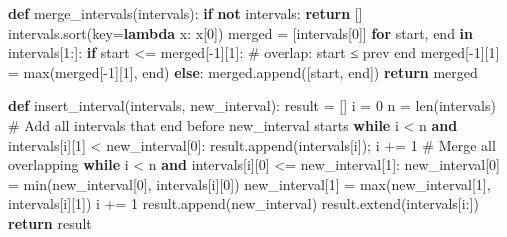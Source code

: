 \documentclass[11pt]{article}
\newenvironment{Shaded}{\begin{snugshade}}{\end{snugshade}}
\newcommand{\BuiltInTok}[1]{\textcolor[rgb]{0.50,0.55,0.55}{#1}}
\newcommand{\CommentTok}[1]{\textcolor[rgb]{0.48,0.49,0.49}{#1}}
\newcommand{\ControlFlowTok}[1]{\textcolor[rgb]{0.99,0.74,0.29}{\textbf{#1}}}
\newcommand{\DecValTok}[1]{\textcolor[rgb]{0.96,0.45,0.00}{#1}}
\newcommand{\KeywordTok}[1]{\textcolor[rgb]{0.81,0.81,0.76}{\textbf{#1}}}
\newcommand{\NormalTok}[1]{\textcolor[rgb]{0.81,0.81,0.76}{#1}}
\newcommand{\OperatorTok}[1]{\textcolor[rgb]{0.81,0.81,0.76}{#1}}
\begin{document}
\begin{Shaded}
\begin{Highlighting}[]
\KeywordTok{def}\NormalTok{ merge\_intervals(intervals):}
    \ControlFlowTok{if} \KeywordTok{not}\NormalTok{ intervals:}
        \ControlFlowTok{return}\NormalTok{ []}
\NormalTok{    intervals.sort(key}\OperatorTok{=}\KeywordTok{lambda}\NormalTok{ x: x[}\DecValTok{0}\NormalTok{])}
\NormalTok{    merged }\OperatorTok{=}\NormalTok{ [intervals[}\DecValTok{0}\NormalTok{]]}
    \ControlFlowTok{for}\NormalTok{ start, end }\KeywordTok{in}\NormalTok{ intervals[}\DecValTok{1}\NormalTok{:]:}
        \ControlFlowTok{if}\NormalTok{ start }\OperatorTok{\textless{}=}\NormalTok{ merged[}\OperatorTok{{-}}\DecValTok{1}\NormalTok{][}\DecValTok{1}\NormalTok{]:          }\CommentTok{\# overlap: start ≤ prev end}
\NormalTok{            merged[}\OperatorTok{{-}}\DecValTok{1}\NormalTok{][}\DecValTok{1}\NormalTok{] }\OperatorTok{=} \BuiltInTok{max}\NormalTok{(merged[}\OperatorTok{{-}}\DecValTok{1}\NormalTok{][}\DecValTok{1}\NormalTok{], end)}
        \ControlFlowTok{else}\NormalTok{:}
\NormalTok{            merged.append([start, end])}
    \ControlFlowTok{return}\NormalTok{ merged}

\KeywordTok{def}\NormalTok{ insert\_interval(intervals, new\_interval):}
\NormalTok{    result }\OperatorTok{=}\NormalTok{ []}
\NormalTok{    i }\OperatorTok{=} \DecValTok{0}
\NormalTok{    n }\OperatorTok{=} \BuiltInTok{len}\NormalTok{(intervals)}
    \CommentTok{\# Add all intervals that end before new\_interval starts}
    \ControlFlowTok{while}\NormalTok{ i }\OperatorTok{\textless{}}\NormalTok{ n }\KeywordTok{and}\NormalTok{ intervals[i][}\DecValTok{1}\NormalTok{] }\OperatorTok{\textless{}}\NormalTok{ new\_interval[}\DecValTok{0}\NormalTok{]:}
\NormalTok{        result.append(intervals[i])}\OperatorTok{;}\NormalTok{ i }\OperatorTok{+=} \DecValTok{1}
    \CommentTok{\# Merge all overlapping}
    \ControlFlowTok{while}\NormalTok{ i }\OperatorTok{\textless{}}\NormalTok{ n }\KeywordTok{and}\NormalTok{ intervals[i][}\DecValTok{0}\NormalTok{] }\OperatorTok{\textless{}=}\NormalTok{ new\_interval[}\DecValTok{1}\NormalTok{]:}
\NormalTok{        new\_interval[}\DecValTok{0}\NormalTok{] }\OperatorTok{=} \BuiltInTok{min}\NormalTok{(new\_interval[}\DecValTok{0}\NormalTok{], intervals[i][}\DecValTok{0}\NormalTok{])}
\NormalTok{        new\_interval[}\DecValTok{1}\NormalTok{] }\OperatorTok{=} \BuiltInTok{max}\NormalTok{(new\_interval[}\DecValTok{1}\NormalTok{], intervals[i][}\DecValTok{1}\NormalTok{])}
\NormalTok{        i }\OperatorTok{+=} \DecValTok{1}
\NormalTok{    result.append(new\_interval)}
\NormalTok{    result.extend(intervals[i:])}
    \ControlFlowTok{return}\NormalTok{ result}
\end{Highlighting}
\end{Shaded}
\end{document}
